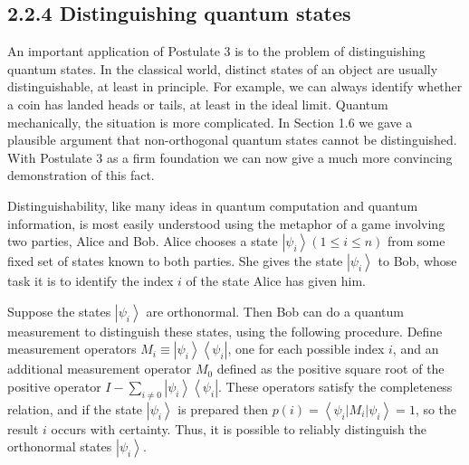 \documentclass[10pt]{article}
\begin{document}
\subsection*{2.2.4 Distinguishing quantum states}
An important application of Postulate 3 is to the problem of distinguishing quantum states. In the classical world, distinct states of an object are usually distinguishable, at least in principle. For example, we can always identify whether a coin has landed heads or tails, at least in the ideal limit. Quantum mechanically, the situation is more complicated. In Section 1.6 we gave a plausible argument that non-orthogonal quantum states cannot be distinguished. With Postulate 3 as a firm foundation we can now give a much more convincing demonstration of this fact.

Distinguishability, like many ideas in quantum computation and quantum information, is most easily understood using the metaphor of a game involving two parties, Alice and Bob. Alice chooses a state $\left|\psi_{i}\right\rangle(1 \leq i \leq n)$ from some fixed set of states known to both parties. She gives the state $\left|\psi_{i}\right\rangle$ to Bob, whose task it is to identify the index $i$ of the state Alice has given him.

Suppose the states $\left|\psi_{i}\right\rangle$ are orthonormal. Then Bob can do a quantum measurement to distinguish these states, using the following procedure. Define measurement operators $M_{i} \equiv\left|\psi_{i}\right\rangle\left\langle\psi_{i}\right|$, one for each possible index $i$, and an additional measurement operator $M_{0}$ defined as the positive square root of the positive operator $I-\sum_{i \neq 0}\left|\psi_{i}\right\rangle\left\langle\psi_{i}\right|$. These operators satisfy the completeness relation, and if the state $\left|\psi_{i}\right\rangle$ is prepared then $p(i)=\left\langle\psi_{i}\left|M_{i}\right| \psi_{i}\right\rangle=1$, so the result $i$ occurs with certainty. Thus, it is possible to reliably distinguish the orthonormal states $\left|\psi_{i}\right\rangle$.
\end{document}
